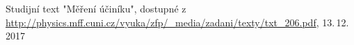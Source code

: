 \documentclass[0-protokol.tex]{subfiles}
\begin{document}
\begin{thebibliography}{}

Studijní text "Měření účiníku", dostupné z\\ \url{http://physics.mff.cuni.cz/vyuka/zfp/_media/zadani/texty/txt_206.pdf}, 13.\,12.\,2017

\end{thebibliography}
\end{document}
